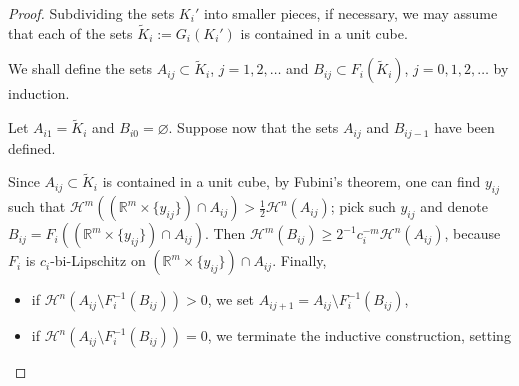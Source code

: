 \documentclass[12pt,leqno]{amsart}
\theoremstyle{definition}
\newcommand{\bbbr}{\mathbb R}
\def\H{{\mathcal H}}
\def\LL{{\mathcal L}}
\numberwithin{theorem}{section} \numberwithin{equation}{section}
\begin{document}
\begin{proof}
Subdividing the sets $K_i'$ into smaller pieces, if necessary, we may assume that each of the sets $\tilde{K}_i:=G_i(K_i')$ is contained in a unit cube.


We shall define the sets $A_{ij}\subset \tilde{K}_i$, $j=1,2,\ldots$ and $B_{ij}\subset F_i(\tilde{K}_i)$, $j=0,1,2,\ldots$ by induction.

Let $A_{i1}=\tilde{K}_i$ and $B_{i0}=\varnothing$. Suppose now that the sets $A_{ij}$ and $B_{ij-1}$ have been defined.








Since $A_{ij}\subset\tilde{K}_i$ is contained in a unit cube,
by Fubini's theorem, one can find $y_{ij}$ such that $\H^m((\bbbr^m\times\{y_{ij}\})\cap A_{ij})>\frac{1}{2}\H^n(A_{ij})$; pick such $y_{ij}$ and denote $B_{ij}=F_i((\bbbr^m\times\{y_{ij}\})\cap A_{ij})$. Then $\H^m(B_{ij})\geq 2^{-1}c_i^{-m}\H^n(A_{ij})$, because $F_i$ is $c_i$-bi-Lipschitz on $(\bbbr^m\times\{ y_{ij}\})\cap A_{ij}$.
Finally, \begin{itemize}
    \item if $\H^n(A_{ij}\setminus F_i^{-1}(B_{ij}))>0$, we set $A_{ij+1}=A_{ij}\setminus F_i^{-1}(B_{ij})$,
    \item if $\H^n(A_{ij}\setminus F_i^{-1}(B_{ij}))=0$, we terminate the inductive construction, setting


\end{itemize}
\end{proof}
\end{document}
